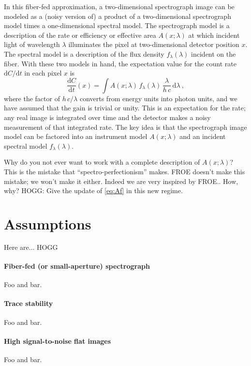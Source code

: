 \documentclass[modern]{aastex631}
\newcommand{\dd}{\mathrm{d}}
\begin{document}
In this fiber-fed approximation, a two-dimensional spectrograph image can be modeled as a (noisy version of) a product of a two-dimensional spectrograph model times a one-dimensional spectral model.
The spectrograph model is a description of the rate or efficiency or effective area $A(x;\lambda)$ at which incident light of wavelength $\lambda$ illuminates the pixel at two-dimensional detector position $x$.
The spectral model is a description of the flux density $f_\lambda(\lambda)$ incident on the fiber.
With these two models in hand, the expectation value for the count rate $\dd C/\dd t$ in each pixel $x$ is
\begin{equation}\label{eq:Af}
    \frac{\dd C}{\dd t}(x) = \int A(x;\lambda)\,f_\lambda(\lambda)\,\frac{\lambda}{h\,c}\,\dd\lambda ~,
\end{equation}
where the factor of $h\,c/\lambda$ converts from energy units into photon units, and we have assumed that the gain is trivial or unity.
This is an expectation for the rate; any real image is integrated over time and the detector makes a noisy measurement of that integrated rate.
The key idea is that the spectrograph image model can be factored into an instrument model $A(x;\lambda)$ and an incident spectral model $f_\lambda(\lambda)$.

Why do you not ever want to work with a complete description of $A(x;\lambda)$?
This is the mistake that ``spectro-perfectionism'' \cite{sp} makes.
FROE doesn't make this mistake; we won't make it either.
Indeed we are very inspired by FROE.. How, why?
HOGG: Give the update of \eqref{eq:Af} in this new regime.

\section{Assumptions}

Here are... HOGG

\paragraph{Fiber-fed (or small-aperture) spectrograph}
Foo and bar.

\paragraph{Trace stability}
Foo and bar.

\paragraph{High signal-to-noise flat images}
Foo and bar.
\end{document}
